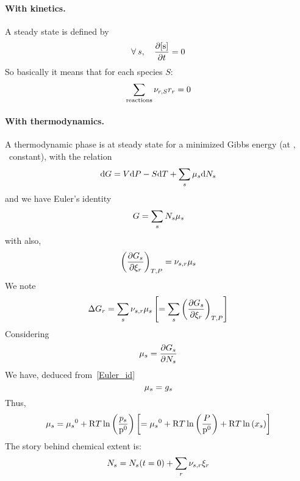 \paragraph{With kinetics.}
A steady state is defined by
%
\begin{equation}
\forall\:s,\quad \doverdt{\conc[s]} = 0
\label{equilibrium:def}
\end{equation}
%
So basically it means that for each species $S$:
\begin{equation}
\sum_{\text{reactions}}\scoef[r,S] \rate[r] = 0
\end{equation}
%

\paragraph{With thermodynamics.}
A thermodynamic phase is at steady state
for a minimized Gibbs energy (at \Temp, \Press\ constant), with
the relation
\begin{equation}
\dd\Gibbs = \Vol\dd\Press - \Entr\dd\Temp + \sum_s\chempot[s]\dd\Mol[s]
\end{equation}
and we have Euler's identity
\begin{equation}
\Gibbs = \sum_s \Mol[s]\chempot[s]
\label{Euler_id}
\end{equation}
with also,
\begin{equation}
\left(\doverdext[r]{\Gibbs[s]}\right)_{\Temp,\Press} = \scoef[s,r]\chempot[s]
\end{equation}
We note
\begin{equation}
\DGibbs_r = \sum_s \scoef[s,r]\chempot[s] \left[= \sum_s \left(\doverdext[r]{\Gibbs[s]}\right)_{\Temp,\Press}\right]
\end{equation}
Considering
\begin{equation}
\chempot_s = \doverdn[s]{\Gibbs[s]}
\end{equation}
We have, deduced from~\ref{Euler_id}
\begin{equation}
\chempot[s] = \gibbs[s]
\end{equation}
Thus,
\begin{equation}
\chempot[s] = \chempotZ[s] + \Rg\Temp\ln\left(\frac{\press[s]}{\pz}\right)
     \left[ = \chempotZ[s] + \Rg\Temp\ln\left(\frac{\Press}{\pz}\right) + \Rg\Temp\ln\left(\molarfrac[s]\right) \right]
\end{equation}
The story behind chemical extent is:
\begin{equation}
\Mol[s] = \Mol[s](t=0) + \sum_r \scoef[s,r] \ext[r]
\end{equation}
